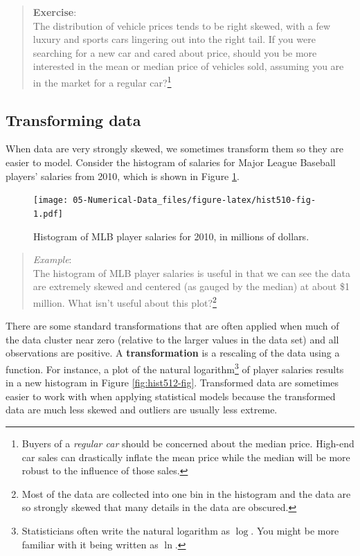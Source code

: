 \documentclass[
]{book}
\begin{document}
\begin{quote}
\textbf{Exercise}:\\
The distribution of vehicle prices tends to be right skewed, with a few luxury and sports cars lingering out into the right tail. If you were searching for a new car and cared about price, should you be more interested in the mean or median price of vehicles sold, assuming you are in the market for a regular car?\footnote{Buyers of a \emph{regular car} should be concerned about the median price. High-end car sales can drastically inflate the mean price while the median will be more robust to the influence of those sales.}
\end{quote}

\hypertarget{transforming-data}{%
\subsection{Transforming data}\label{transforming-data}}

When data are very strongly skewed, we sometimes transform them so they are easier to model. Consider the histogram of salaries for Major League Baseball players' salaries from 2010, which is shown in Figure \ref{fig:hist510-fig}.

\begin{figure}
\centering
\texttt{[image: 05-Numerical-Data\_files/figure-latex/hist510-fig-1.pdf]}
\caption{\label{fig:hist510-fig}Histogram of MLB player salaries for 2010, in millions of dollars.}
\end{figure}

\begin{quote}
\emph{Example}:\\
The histogram of MLB player salaries is useful in that we can see the data are extremely skewed and centered (as gauged by the median) at about \$1 million. What isn't useful about this plot?\footnote{Most of the data are collected into one bin in the histogram and the data are so strongly skewed that many details in the data are obscured.}
\end{quote}

There are some standard transformations that are often applied when much of the data cluster near zero (relative to the larger values in the data set) and all observations are positive. A \textbf{transformation} is a rescaling of the data using a function. For instance, a plot of the natural logarithm\footnote{Statisticians often write the natural logarithm as \(\log\). You might be more familiar with it being written as \(\ln\).} of player salaries results in a new histogram in Figure \ref{fig:hist512-fig}. Transformed data are sometimes easier to work with when applying statistical models because the transformed data are much less skewed and outliers are usually less extreme.
\end{document}
